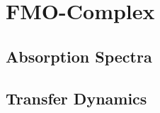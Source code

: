 \section{FMO-Complex}
\label{sec:num.fmo}


\subsection{Absorption Spectra}
\label{sub:num.fmo.absorption}

\subsection{Transfer Dynamics}
\label{sub:num.fmo.dynamics}

\cite{PlMGr86_casimir}
